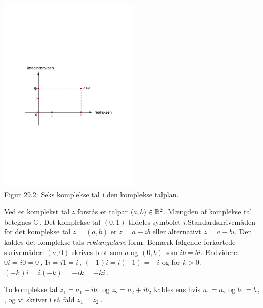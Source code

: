 \begin{center}
	\includegraphics[trim=3cm 9.5cm 3cm 9.5cm,width=0.5\textwidth,clip]{Geometer/KompleksPlan2.pdf}\\
Figur 29.2: Seks komplekse tal i den komplekse talplan.		
\end{center}

\begin{definition}
Ved et komplekst tal $z$ forstås et talpar $(a,b)\in \mathbb{R}^2$. Mængden af komplekse tal betegnes $\mathbb C\,.$\bs
Det komplekse tal $(0,1)$ tildeles symbolet $i$.\bs Standardskrivemåden for det komplekse tal $z=(a,b)$ er 
 $z=a+ib$ eller alternativt $z=a+bi$. Den kaldes det komplekse tals \textit{rektangulære} form.\bs
Bemærk følgende forkortede skrivemåder: $(a,0)$ skrives blot som $a$ og $(0,b)$ som $ib=bi$. Endvidere: $0i=i0=0\,,\,1i=i1=i\,,\,(-1)i=i(-1)=-i$ og for $k>0:$ $(-k)i=i(-k)=-ik=-ki\,$.
\end{definition}

\begin{aha}
To komplekse tal $z_1=a_1+ib_1$ og $z_2=a_2+ib_2$ kaldes ens hvis $a_1=a_2$ og $b_1=b_2\,$, og vi skriver i så fald $z_1=z_2\,$. 
\end{aha}



